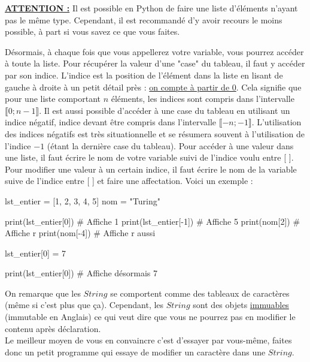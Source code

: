 \documentclass[a4paper,12pt]{article}
\begin{document}
{\color{red}
\textbf{\underline{ATTENTION :}} Il est possible en Python de faire une liste d'éléments n'ayant pas le même type. Cependant, il est recommandé d'y avoir recours le moins possible, à part si vous savez ce que vous faites. \newline
}

Désormais, à chaque fois que vous appellerez votre variable, vous pourrez accéder à toute la liste. Pour récupérer la valeur d'une "case" du tableau, il faut y accéder
par son indice. L'indice est la position de l'élément dans la liste en lisant de gauche à droite à un petit détail près : \underline{on compte à partir de 0}. 
Cela signifie que pour une liste comportant $n$ éléments, les indices sont compris dans l'intervalle $\llbracket0;n-1\rrbracket$. Il est aussi possible d'accéder à une 
case du tableau en utilisant un indice négatif, indice devant être compris dans l'intervalle $\llbracket-n;-1\rrbracket$. L'utilisation des indices négatifs est très 
situationnelle et se résumera souvent à l'utilisation de l'indice $-1$ (étant la dernière case du tableau). \newline
Pour accéder à une valeur dans une liste, il faut écrire le nom de votre variable suivi de l'indice voulu entre [ ]. \newline
Pour modifier une valeur à un certain indice, il faut écrire le nom de la variable suive de l'indice entre [ ] et faire une affectation. \newline 
Voici un exemple : 
\begin{pythoncode}
    lst_entier = [1, 2, 3, 4, 5]
    nom = "Turing" 

    print(lst_entier[0]) # Affiche 1
    print(lst_entier[-1]) # Affiche 5 
    print(nom[2]) # Affiche r
    print(nom[-4]) # Affiche r aussi

    lst_entier[0] = 7

    print(lst_entier[0]) # Affiche désormais 7
\end{pythoncode}

{\color{darkgreen}
On remarque que les $String$ se comportent comme des tableaux de caractères (même si c'est plus que ça). Cependant, les $String$ sont des objets \underline{immuables}
(immutable en Anglais) ce qui veut dire que vous ne pourrez pas en modifier le contenu après déclaration. \\
Le meilleur moyen de vous en convaincre c'est d'essayer par vous-même, faites donc un petit programme qui essaye de modifier un caractère dans une $String$.
}
\end{document}
